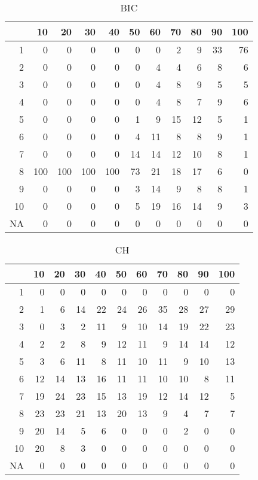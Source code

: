 \documentclass[11pt]{article}
\begin{document}
\begin{table}[H]
\centering
\begin{tabular}{rrrrrrrrrrr}
  \hline
 & 10 & 20 & 30 & 40 & 50 & 60 & 70 & 80 & 90 & 100 \\ 
  \hline
1 & 0 & 0 & 0 & 0 & 0 & 0 & 2 & 9 & 33 & 76 \\ 
  2 & 0 & 0 & 0 & 0 & 0 & 4 & 4 & 6 & 8 & 6 \\ 
  3 & 0 & 0 & 0 & 0 & 0 & 4 & 8 & 9 & 5 & 5 \\ 
  4 & 0 & 0 & 0 & 0 & 0 & 4 & 8 & 7 & 9 & 6 \\ 
  5 & 0 & 0 & 0 & 0 & 1 & 9 & 15 & 12 & 5 & 1 \\ 
  6 & 0 & 0 & 0 & 0 & 4 & 11 & 8 & 8 & 9 & 1 \\ 
  7 & 0 & 0 & 0 & 0 & 14 & 14 & 12 & 10 & 8 & 1 \\ 
  8 & 100 & 100 & 100 & 100 & 73 & 21 & 18 & 17 & 6 & 0 \\ 
  9 & 0 & 0 & 0 & 0 & 3 & 14 & 9 & 8 & 8 & 1 \\ 
  10 & 0 & 0 & 0 & 0 & 5 & 19 & 16 & 14 & 9 & 3 \\ 
  NA & 0 & 0 & 0 & 0 & 0 & 0 & 0 & 0 & 0 & 0 \\ 
   \hline
\end{tabular}
\caption{BIC} 
\end{table}
\begin{table}[H]
\centering
\begin{tabular}{rrrrrrrrrrr}
  \hline
 & 10 & 20 & 30 & 40 & 50 & 60 & 70 & 80 & 90 & 100 \\ 
  \hline
1 & 0 & 0 & 0 & 0 & 0 & 0 & 0 & 0 & 0 & 0 \\ 
  2 & 1 & 6 & 14 & 22 & 24 & 26 & 35 & 28 & 27 & 29 \\ 
  3 & 0 & 3 & 2 & 11 & 9 & 10 & 14 & 19 & 22 & 23 \\ 
  4 & 2 & 2 & 8 & 9 & 12 & 11 & 9 & 14 & 14 & 12 \\ 
  5 & 3 & 6 & 11 & 8 & 11 & 10 & 11 & 9 & 10 & 13 \\ 
  6 & 12 & 14 & 13 & 16 & 11 & 11 & 10 & 10 & 8 & 11 \\ 
  7 & 19 & 24 & 23 & 15 & 13 & 19 & 12 & 14 & 12 & 5 \\ 
  8 & 23 & 23 & 21 & 13 & 20 & 13 & 9 & 4 & 7 & 7 \\ 
  9 & 20 & 14 & 5 & 6 & 0 & 0 & 0 & 2 & 0 & 0 \\ 
  10 & 20 & 8 & 3 & 0 & 0 & 0 & 0 & 0 & 0 & 0 \\ 
  NA & 0 & 0 & 0 & 0 & 0 & 0 & 0 & 0 & 0 & 0 \\ 
   \hline
\end{tabular}
\caption{CH} 
\end{table}
\end{document}
